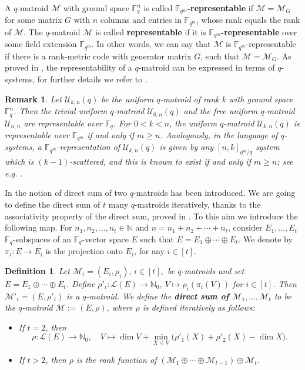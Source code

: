 \documentclass[11pt]{amsart}
\newtheorem{definition}[theorem]{Definition}
\newtheorem{remark}[theorem]{Remark}
\newcommand{\mM}{\mathcal{M}}
\newcommand{\mL}{\mathcal{L}}
\newcommand{\mU}{\mathcal{U}}
\newcommand{\Fmk}{[n,k]_{q^m/q}}
\newcommand{\F}{{\mathbb F}}
\newcommand{\fq}{{\mathbb F}_{q}}
\newcommand{\Fm}{\mathbb{F}_{q^m}}
\begin{document}
A $q$-matroid $\mM$ with ground space $\F_q^n$ is called \textbf{$\F_{q^m}$-representable} if $\mM=\mM_G$ for some matrix $G$ with  $n$ columns and entries in $\F_{q^m}$, whose rank equals the rank of $\mM$. The $q$-matroid $\mM$ is called \textbf{representable} if it is \textbf{$\F_{q^m}$-representable} over some field extension $\F_{q^m}$.
In other words, we can say that $\mM$ is $\F_{q^m}$-representable if there is a rank-metric code with generator matrix $G$, such that $\mM=\mM_G$. 
As proved in \cite{alfarano2022cyclic}, the representability of a $q$-matroid can be expressed in terms of $q$-systems, for further details we refer to \cite[Theorem 4.6]{alfarano2022cyclic}.

\begin{remark}
Let $\mU_{k,n}(q)$ be the uniform $q$-matroid of rank $k$ with ground space $\F_q^n$. Then the \emph{trivial} uniform $q$-matroid $\mU_{0,n}(q)$ and the \emph{free} uniform $q$-matroid $\mU_{n,n}$ are
representable over $\F_q$. For $0 < k < n$, the uniform $q$-matroid $\mU_{k,n}(q)$ is representable over $\F_{q^m}$ if and only if
$m \geq n$.  
Analogously, in the language of $q$-systems, a $\Fm$-representation of $\mathcal U_{k,n}(q)$ is given by any $\Fmk$ system which is $(k-1)$-scattered, and this is known to exist if and only if $m\ge n$; see e.g. \cite{de78,sheekeyVdV}.
\end{remark}


In \cite{ceria2021direct} the notion of direct sum of two $q$-matroids has been introduced. We are going to define the direct sum of $t$ many $q$-matroids iteratively, thanks to the associativity property of the direct sum, proved in \cite{gluesing2023decompositions}.
To this aim we introduce the following map.
For $n_1,n_2,\ldots, n_t\in\mathbb{N}$ and $n=n_1+n_2+\cdots+n_t$, consider $E_1,\ldots,E_t$ $\fq$-subspaces of an $\fq$-vector space $E$ such that $E=E_1\oplus\cdots\oplus E_t$. We denote by
$\pi_i:E\longrightarrow E_i$ is the projection onto $E_i$, for any $i \in [t]$.

\begin{definition}
    Let $\mM_i=(E_i,\rho_i),\,i\in[t],$ be $q$-matroids and set $E=E_1\oplus\cdots\oplus E_t$.
Define $\rho'_i:\mL(E)\longrightarrow \mathbb{N}_0,\ V\longmapsto \rho_i(\pi_i(V))$ for $i\in[t]$.
Then $\mM'_i=(E,\rho'_i)$ is a $q$-matroid. 
We define the \textbf{direct sum of $\mM_1, \ldots,\mM_t$} to be the $q$-matroid $\mM:=(E,\rho)$, where $\rho$ is defined iteratively as follows:
\begin{itemize}
\item If $t=2$, then
\begin{equation}\label{e-rho}
\rho:\mL(E)\longrightarrow\mathbb{N}_0,\quad V\longmapsto \dim V+\min_{X\leq V}\big(\rho'_1(X)+\rho'_2(X)-\dim X\big).
\end{equation}
\item If $t>2$, then $\rho$ is the rank function of $(\mM_1\oplus\cdots\oplus\mM_{t-1})\oplus \mM_t$.
\end{itemize}
\end{definition}
\end{document}
